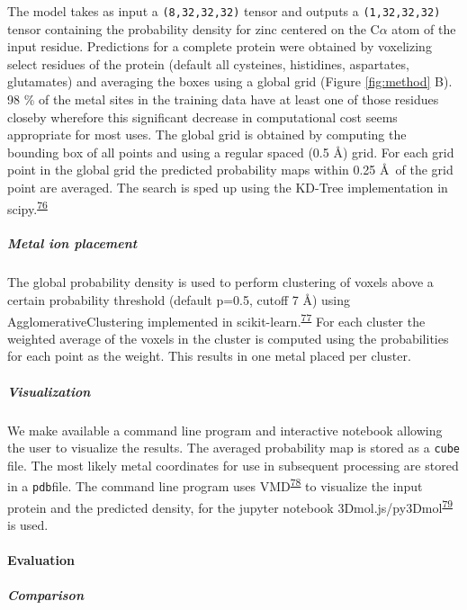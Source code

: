 \documentclass[  ASAPversion,
  ,
  9pt]{elife}
\begin{document}
The model takes as input a \texttt{(8,32,32,32)} tensor and outputs a \texttt{(1,32,32,32)} tensor containing the probability density for zinc centered on the C$\alpha$ atom of the input residue.
Predictions for a complete protein were obtained by voxelizing select residues of the protein (default all cysteines, histidines, aspartates, glutamates) and averaging the boxes using a global grid (Figure \ref{fig:method} B). 98 \% of the metal sites in the training data have at least one of those residues closeby wherefore this significant decrease in computational cost seems appropriate for most uses. The global grid is obtained by computing the bounding box of all points and using a regular spaced (0.5 \AA ) grid. For each grid point in the global grid the predicted probability maps within 0.25 \AA\, of the grid point are averaged. The search is sped up using the KD-Tree implementation in scipy.\textsuperscript{\protect\hyperlink{ref-8Miti2Gz}{76}}

\hypertarget{metal-ion-placement}{%
\subparagraph{Metal ion placement}\label{metal-ion-placement}}

The global probability density is used to perform clustering of voxels above a certain probability threshold (default p=0.5, cutoff 7 \AA ) using AgglomerativeClustering implemented in scikit-learn.\textsuperscript{\protect\hyperlink{ref-AujvwLp6}{77}} For each cluster the weighted average of the voxels in the cluster is computed using the probabilities for each point as the weight. This results in one metal placed per cluster.

\hypertarget{visualization}{%
\subparagraph{Visualization}\label{visualization}}

We make available a command line program and interactive notebook allowing the user to visualize the results. The averaged probability map is stored as a \texttt{cube} file. The most likely metal coordinates for use in subsequent processing are stored in a \texttt{pdb}file. The command line program uses VMD\textsuperscript{\protect\hyperlink{ref-PEXAwV3k}{78}} to visualize the input protein and the predicted density, for the jupyter notebook 3Dmol.js/py3Dmol\textsuperscript{\protect\hyperlink{ref-BguJBlg6}{79}} is used.

\hypertarget{evaluation}{%
\paragraph{Evaluation}\label{evaluation}}

\hypertarget{comparison}{%
\subparagraph{Comparison}\label{comparison}}
\end{document}
